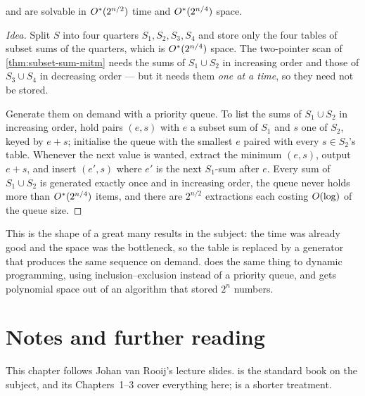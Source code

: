 \begin{theorem}\label{thm:schroeppel-shamir}
 and  are solvable in $O^{*}(2^{n/2})$ time and
$O^{*}(2^{n/4})$ space.
\end{theorem}

\begin{proof}[Idea]
Split $S$ into four quarters $S_1, S_2, S_3, S_4$ and store only the four tables
of subset sums of the quarters, which is $O^{*}(2^{n/4})$ space. The
two-pointer scan of \cref{thm:subset-sum-mitm} needs the sums of
$S_1 \cup S_2$ in increasing order and those of $S_3 \cup S_4$ in decreasing
order --- but it needs them \emph{one at a time}, so they need not be stored.

Generate them on demand with a priority queue. To list the sums of
$S_1 \cup S_2$ in increasing order, hold pairs $(e, s)$ with $e$ a subset sum of
$S_1$ and $s$ one of $S_2$, keyed by $e+s$; initialise the queue with the
smallest $e$ paired with every $s \in S_2$'s table. Whenever the next value is
wanted, extract the minimum $(e,s)$, output $e+s$, and insert $(e', s)$ where
$e'$ is the next $S_1$-sum after $e$. Every sum of $S_1 \cup S_2$ is generated
exactly once and in increasing order, the queue never holds more than
$O^{*}(2^{n/4})$ items, and there are $2^{n/2}$ extractions each costing
$O\!\left(\log\right)$ of the queue size.
\end{proof}

\begin{intuition}
This is the shape of a great many results in the subject: the time was already
good and the space was the bottleneck, so the table is replaced by a generator
that produces the same sequence on demand.  does the same
thing to dynamic programming, using inclusion--exclusion instead of a priority
queue, and gets polynomial space out of an algorithm that stored $2^n$ numbers.
\end{intuition}

\section{Notes and further reading}
\label{sec:exact-i-further-reading}

This chapter follows Johan van Rooij's lecture slides. \citet{FominKratsch2010}
is the standard book on the subject, and its Chapters~1--3 cover everything
here; \citet[Chapter~6]{CyganEtAl2015} is a shorter treatment.

